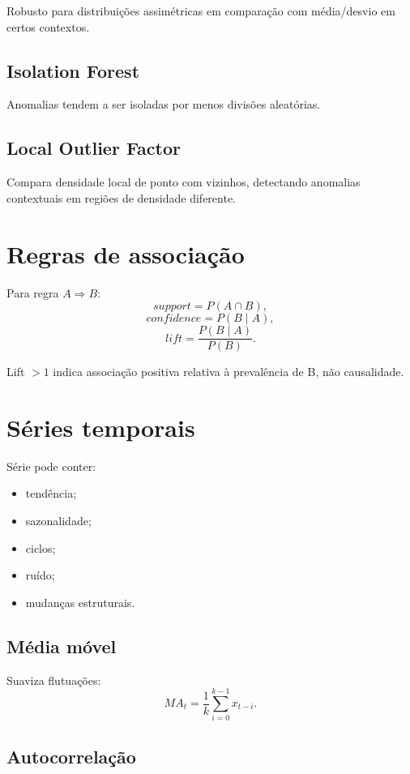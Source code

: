 Robusto para distribuições assimétricas em comparação com média/desvio em certos contextos.

\subsection{Isolation Forest}

Anomalias tendem a ser isoladas por menos divisões aleatórias.

\subsection{Local Outlier Factor}

Compara densidade local de ponto com vizinhos, detectando anomalias contextuais em regiões de densidade diferente.

\section{Regras de associação}

Para regra $A\Rightarrow B$:
\[
support=P(A\cap B),
\]
\[
confidence=P(B\mid A),
\]
\[
lift=\frac{P(B\mid A)}{P(B)}.
\]

Lift $>1$ indica associação positiva relativa à prevalência de B, não causalidade.

\section{Séries temporais}

Série pode conter:
\begin{itemize}
\item tendência;
\item sazonalidade;
\item ciclos;
\item ruído;
\item mudanças estruturais.
\end{itemize}

\subsection{Média móvel}

Suaviza flutuações:
\[
MA_t=\frac{1}{k}\sum_{i=0}^{k-1}x_{t-i}.
\]

\subsection{Autocorrelação}

